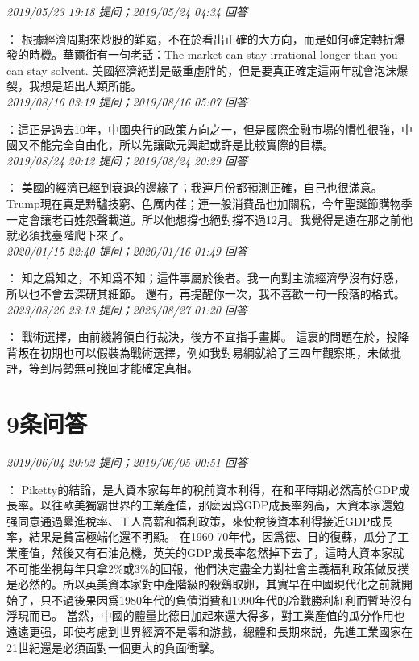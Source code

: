 \documentclass[twocolumn]{ctexart}
\begin{document}
\textit{\hfill\noindent\small 2019/05/23 19:18 提问；2019/05/24 04:34 回答}

：
根據經濟周期來炒股的難處，不在於看出正確的大方向，而是如何確定轉折爆發的時機。華爾街有一句老話：The market can stay irrational longer than you can stay solvent.
美國經濟絕對是嚴重虛胖的，但是要真正確定這兩年就會泡沫爆裂，我想是超出人類所能。
\\

\textit{\hfill\noindent\small 2019/08/16 03:19 提问；2019/08/16 05:07 回答}

：這正是過去10年，中國央行的政策方向之一，但是國際金融市場的慣性很強，中國又不能完全自由化，所以先讓歐元興起或許是比較實際的目標。
\\

\textit{\hfill\noindent\small 2019/08/24 20:12 提问；2019/08/24 20:29 回答}

：
美國的經濟已經到衰退的邊緣了；我連月份都預測正確，自己也很滿意。
Trump現在真是黔驢技窮、色厲内荏；連一般消費品也加關稅，今年聖誕節購物季一定會讓老百姓怨聲載道。所以他想撐也絕對撐不過12月。我覺得是遠在那之前他就必須找臺階爬下來了。
\\

\textit{\hfill\noindent\small 2020/01/15 22:40 提问；2020/01/16 01:49 回答}

：
知之爲知之，不知爲不知；這件事屬於後者。我一向對主流經濟學沒有好感，所以也不會去深研其細節。 
還有，再提醒你一次，我不喜歡一句一段落的格式。
\\

\textit{\hfill\noindent\small 2023/08/26 23:13 提问；2023/08/27 01:20 回答}

：
戰術選擇，由前綫將領自行裁決，後方不宜指手畫脚。
這裏的問題在於，投降背叛在初期也可以假裝為戰術選擇，例如我對易綱就給了三四年觀察期，未做批評，等到局勢無可挽回才能確定真相。
\\

\section{9条问答}

\textit{\hfill\noindent\small 2019/06/04 20:02 提问；2019/06/05 00:51 回答}

：
Piketty的結論，是大資本家每年的稅前資本利得，在和平時期必然高於GDP成長率。以往歐美獨霸世界的工業產值，那麽因爲GDP成長率夠高，大資本家還勉强同意通過纍進稅率、工人高薪和福利政策，來使稅後資本利得接近GDP成長率，結果是貧富極端化還不明顯。 
在1960-70年代，因爲德、日的復蘇，瓜分了工業產值，然後又有石油危機，英美的GDP成長率忽然掉下去了，這時大資本家就不可能坐視每年只拿2\%或3\%的回報，他們決定盡全力對社會主義福利政策做反撲是必然的。所以英美資本家對中產階級的殺鷄取卵，其實早在中國現代化之前就開始了，只不過後果因爲1980年代的負債消費和1990年代的冷戰勝利紅利而暫時沒有浮現而已。 
當然，中國的體量比德日加起來還大得多，對工業產值的瓜分作用也遠遠更强，即使考慮到世界經濟不是零和游戲，總體和長期來説，先進工業國家在21世紀還是必須面對一個更大的負面衝擊。
\\
\end{document}
